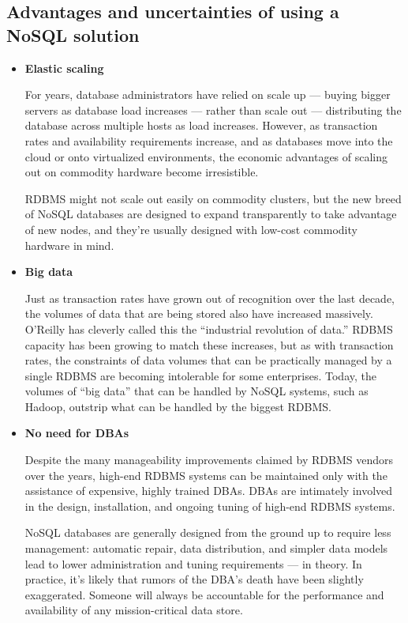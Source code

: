 \subsection{Advantages and uncertainties of using a NoSQL solution}

\begin{itemize}

\item \textbf{Elastic scaling}

For years, database administrators have relied on scale up — buying bigger servers as database load increases — rather than scale out — distributing the database across multiple hosts as load increases. However, as transaction rates and availability requirements increase, and as databases move into the cloud or onto virtualized environments, the economic advantages of scaling out on commodity hardware become irresistible.

RDBMS might not scale out easily on commodity clusters, but the new breed of NoSQL databases are designed to expand transparently to take advantage of new nodes, and they’re usually designed with low-cost commodity hardware in mind.


\item \textbf{Big data}

Just as transaction rates have grown out of recognition over the last decade, the volumes of data that are being stored also have increased massively. O’Reilly has cleverly called this the “industrial revolution of data.” RDBMS capacity has been growing to match these increases, but as with transaction rates, the constraints of data volumes that can be practically managed by a single RDBMS are becoming intolerable for some enterprises. Today, the volumes of “big data” that can be handled by NoSQL systems, such as Hadoop, outstrip what can be handled by the biggest RDBMS.


\item \textbf{No need for DBAs}

Despite the many manageability improvements claimed by RDBMS vendors over the years, high-end RDBMS systems can be maintained only with the assistance of expensive, highly trained DBAs. DBAs are intimately involved in the design, installation, and ongoing tuning of high-end RDBMS systems.

NoSQL databases are generally designed from the ground up to require less management:  automatic repair, data distribution, and simpler data models lead to lower administration and tuning requirements — in theory. In practice, it’s likely that rumors of the DBA’s death have been slightly exaggerated. Someone will always be accountable for the performance and availability of any mission-critical data store.



\end{itemize}

